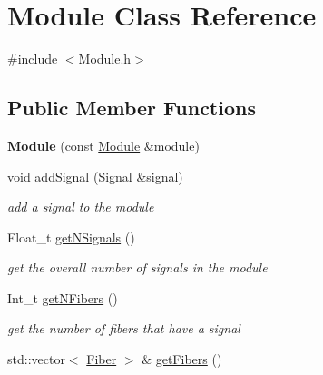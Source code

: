 \hypertarget{classModule}{}\section{Module Class Reference}
\label{classModule}


{\ttfamily \#include $<$Module.\+h$>$}

\subsection*{Public Member Functions}
\begin{DoxyCompactItemize}
\item 
\mbox{\label{classModule_ad0a52f08a2b590f1879e58c0b854c4b6}} 
{\bfseries Module} (const \hyperlink{classModule}{Module} \&module)
\item 
\mbox{\label{classModule_a7be6d9ea0d898240dfdfafbf55ea35b1}} 
void \hyperlink{classModule_a7be6d9ea0d898240dfdfafbf55ea35b1}{add\+Signal} (\hyperlink{classSignal}{Signal} \&signal)
\begin{DoxyCompactList}\small\item\em add a signal to the module \end{DoxyCompactList}\item 
\mbox{\label{classModule_a78074ce52f8530dff00761e3a6448398}} 
Float\+\_\+t \hyperlink{classModule_a78074ce52f8530dff00761e3a6448398}{get\+N\+Signals} ()
\begin{DoxyCompactList}\small\item\em get the overall number of signals in the module \end{DoxyCompactList}\item 
\mbox{\label{classModule_a7b3520db1573e500bc4a85cc13cdcb36}} 
Int\+\_\+t \hyperlink{classModule_a7b3520db1573e500bc4a85cc13cdcb36}{get\+N\+Fibers} ()
\begin{DoxyCompactList}\small\item\em get the number of fibers that have a signal \end{DoxyCompactList}\item 
\mbox{\label{classModule_a31a945c5ff64a78efd1d9e0ec35f31f0}} 
std\+::vector$<$ \hyperlink{classFiber}{Fiber} $>$ \& \hyperlink{classModule_a31a945c5ff64a78efd1d9e0ec35f31f0}{get\+Fibers} ()

\end{DoxyCompactItemize}
